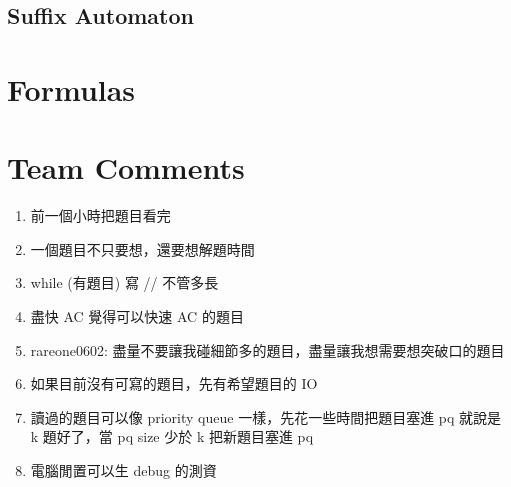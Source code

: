 \subsection{Suffix Automaton}


\section{Formulas}


\section{Team Comments}
\begin{enumerate}
\item 前一個小時把題目看完
\item 一個題目不只要想，還要想解題時間
\item while (有題目) 寫 // 不管多長
\item 盡快 AC 覺得可以快速 AC 的題目
\item rareone0602: 盡量不要讓我碰細節多的題目，盡量讓我想需要想突破口的題目
\item 如果目前沒有可寫的題目，先有希望題目的 IO
\item 讀過的題目可以像 priority queue 一樣，先花一些時間把題目塞進 pq 就說是 k 題好了，當 pq size 少於 k 把新題目塞進 pq
\item 電腦閒置可以生 debug 的測資
\end{enumerate}